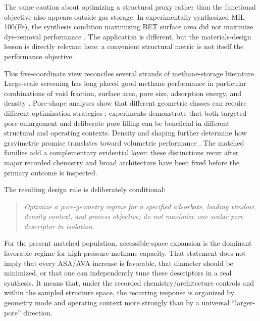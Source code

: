 \documentclass[11pt,a4paper]{article}
\begin{document}
The same caution about optimizing a structural proxy rather than the functional
objective also appears outside gas storage. In experimentally synthesized
MIL-100(Fe), the synthesis condition maximizing BET surface area did not maximize
dye-removal performance \cite{zahediasl2026functionality}. The application is
different, but the materials-design lesson is directly relevant here: a convenient
structural metric is not itself the performance objective.

This five-coordinate view reconciles several strands of methane-storage literature.
Large-scale screening has long placed good methane performance in particular
combinations of void fraction, surface area, pore size, adsorption energy, and
density \cite{wilmer2012screening,fernandez2013qspr,
gomezgualdron2014limits}. Pore-shape analyses show that different geometric classes
can require different optimization strategies \cite{lee2017poregeometry};
experiments demonstrate that both targeted pore enlargement
\cite{liang2017poregeometry,song2026poreengineering} and deliberate pore filling
\cite{tran2015porefilling} can be beneficial in different structural and operating
contexts. Density and shaping further determine how gravimetric promise translates
toward volumetric performance
\cite{peng2013methane,korman2020lowpressure,connolly2019monolith}. The matched
families add a complementary evidential layer: these distinctions recur after major
recorded chemistry and broad architecture have been fixed before the primary
outcome is inspected.

The resulting design rule is deliberately conditional:

\begin{quote}
\emph{Optimize a pore-geometry regime for a specified adsorbate, loading window,
density context, and process objective; do not maximize one scalar pore descriptor
in isolation.}
\end{quote}

For the present matched population, accessible-space expansion is the dominant
favorable regime for high-pressure methane capacity. That statement does not imply
that every ASA/AVA increase is favorable, that diameter should be minimized, or
that one can independently tune these descriptors in a real synthesis. It means
that, under the recorded chemistry/architecture controls and within the sampled
structure space, the recurring response is organized by geometry mode and operating
context more strongly than by a universal ``larger-pore'' direction.
\end{document}
